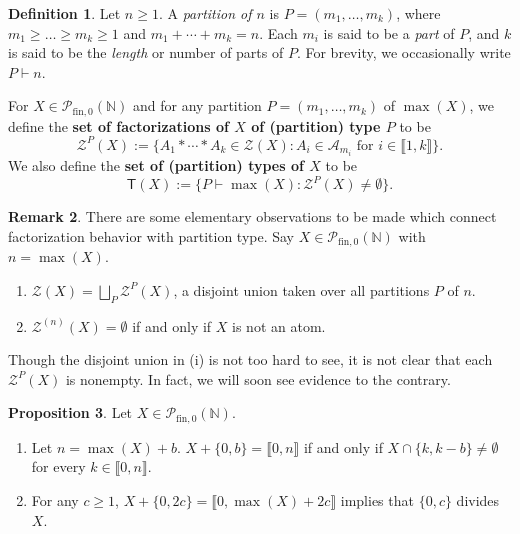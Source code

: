 \documentclass{report}
\newcommand{\NN}{\mathbb{N}}
\renewcommand{\P}{\mathcal{P}}
\newcommand{\Z}{\mathcal{Z}}
\newcommand{\llb}{\llbracket}
\newcommand{\rrb}{\rrbracket}
\newcommand{\fin}{\textrm{fin}}
\renewcommand{\:}{\text{:}}
\newcommand{\PN}{{\P_{\fin,0}(\NN)}}
\theoremstyle{definition}
\newtheorem{defn}{Definition}[section]
\newtheorem{prop}[defn]{Proposition}
\newtheorem{rk}[defn]{Remark}
\begin{document}
\begin{defn}
	Let $n\ge 1$. A \textit{partition of $n$} is $P = (m_1,\dots, m_k)$, where $m_1 \ge \dots \ge m_k \ge 1$ and $m_1+\cdots + m_k = n$. 
	Each $m_i$ is said to be a \textit{part} of $P$, and $k$ is said to be the \textit{length} or number of parts of $P$.
	For brevity, we occasionally write $P \vdash n$.
	
	For $X \in \PN$ and for any partition $P = (m_1,\dots, m_k)$ of $\max(X)$, we define the \textbf{set of factorizations of $X$ of (partition) type $P$} to be
	\[ \Z^P(X) := \{ A_1*\cdots * A_k \in \Z(X) : A_i \in \mathcal{A}_{m_i} \textrm{ for } i\in \llb 1,k \rrb \}. \]
	We also define the \textbf{set of (partition) types of $X$} to be
	\[ \mathsf{T}(X) :=  \{ P \vdash \max(X) : \Z^P(X) \neq \emptyset \}. \]
\end{defn}

\begin{rk}
	There are some elementary observations to be made which connect factorization behavior with partition type.
	Say $X \in \PN$ with $n = \max(X)$.
	\begin{enumerate}[label={\rm (\roman{*})}]
		\item $\Z(X) = \bigsqcup_{P} \Z^P(X)$, a disjoint union taken over all partitions $P$ of $n$.
		\item $\Z^{(n)}(X) = \emptyset$ if and only if $X$ is not an atom.
	\end{enumerate}
	Though the disjoint union in (i) is not too hard to see, it is not clear that each $\Z^P(X)$ is nonempty.
	In fact, we will soon see evidence to the contrary.
\end{rk}



\begin{prop} \label{prop:2-elt factor/cofactor}
	Let $X\in \PN$.
	\begin{enumerate}[label={\rm (\roman{*})}]
		\item Let $n = \max(X) + b$. $X + \{0,b\} = \llb 0,n \rrb$ if and only if $X \cap \{k,k-b\} \neq \emptyset$ for every $k\in \llb 0,n \rrb$.
		\item For any $c\ge 1$, $X + \{0,2c\} = \llb 0,\max(X)+2c \rrb$ implies that $\{0,c\}$ divides $X$.
	\end{enumerate}
\end{prop}
\end{document}
